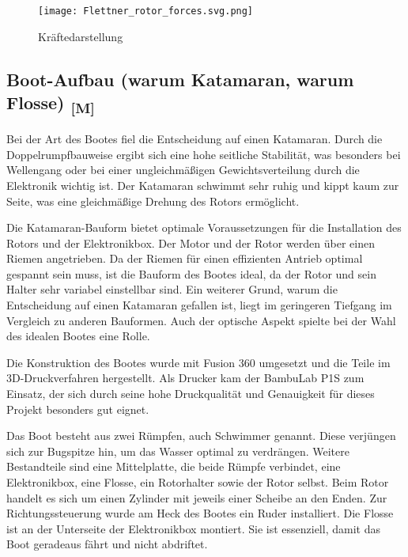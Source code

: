 \documentclass[a4paper,12pt]{article}
\begin{document}
\begin{figure}[H]
    \centering
    \texttt{[image: Flettner\_rotor\_forces.svg.png]}
    \caption{Kräftedarstellung \cite{Flettner_Rotor_Wiki}}
    \label{fig:Kräftedarstellung}
\end{figure}



\newpage


\subsection{\texorpdfstring{Boot-Aufbau (warum Katamaran, warum Flosse) \textsubscript{[M]}}{Boot-Aufbau (warum Katamaran, warum Flosse) [M]}}
\label{sec:Boot-Aufbau}

Bei der Art des Bootes fiel die Entscheidung auf einen Katamaran. Durch die Doppelrumpfbauweise ergibt sich eine hohe seitliche Stabilität, was besonders bei Wellengang oder bei einer ungleichmäßigen Gewichtsverteilung durch die Elektronik wichtig ist. Der Katamaran schwimmt sehr ruhig und kippt kaum zur Seite, was eine gleichmäßige Drehung des Rotors ermöglicht.\newline

Die Katamaran-Bauform bietet optimale Voraussetzungen für die Installation des Rotors und der Elektronikbox. Der Motor und der Rotor werden über einen Riemen angetrieben. Da der Riemen für einen effizienten Antrieb optimal gespannt sein muss, ist die Bauform des Bootes ideal, da der Rotor und sein Halter sehr variabel einstellbar sind. Ein weiterer Grund, warum die Entscheidung auf einen Katamaran gefallen ist, liegt im geringeren Tiefgang im Vergleich zu anderen Bauformen. Auch der optische Aspekt spielte bei der Wahl des idealen Bootes eine Rolle.\newline

Die Konstruktion des Bootes wurde mit Fusion 360 umgesetzt und die Teile im 3D-Druckverfahren hergestellt. Als Drucker kam der BambuLab P1S zum Einsatz, der sich durch seine hohe Druckqualität und Genauigkeit für dieses Projekt besonders gut eignet.

Das Boot besteht aus zwei Rümpfen, auch Schwimmer genannt. Diese verjüngen sich zur Bugspitze hin, um das Wasser optimal zu verdrängen. Weitere Bestandteile sind eine Mittelplatte, die beide Rümpfe verbindet, eine Elektronikbox, eine Flosse, ein Rotorhalter sowie der Rotor selbst. Beim Rotor handelt es sich um einen Zylinder mit jeweils einer Scheibe an den Enden. Zur Richtungssteuerung wurde am Heck des Bootes ein Ruder installiert. Die Flosse ist an der Unterseite der Elektronikbox montiert. Sie ist essenziell, damit das Boot geradeaus fährt und nicht abdriftet.\newline
\end{document}
